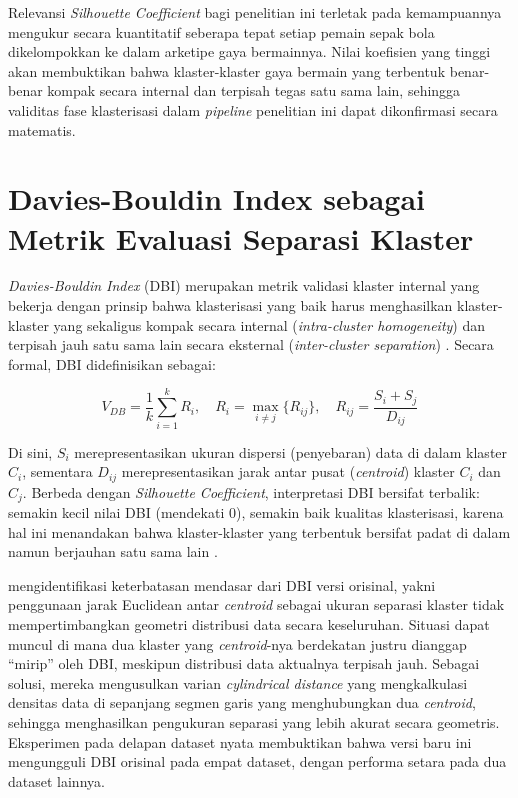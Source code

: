 Relevansi \emph{Silhouette Coefficient} bagi penelitian ini terletak pada kemampuannya mengukur secara kuantitatif seberapa tepat setiap pemain sepak bola dikelompokkan ke dalam arketipe gaya bermainnya. Nilai koefisien yang tinggi akan membuktikan bahwa klaster-klaster gaya bermain yang terbentuk benar-benar kompak secara internal dan terpisah tegas satu sama lain, sehingga validitas fase klasterisasi dalam \emph{pipeline} penelitian ini dapat dikonfirmasi secara matematis.

\section{Davies-Bouldin Index sebagai Metrik Evaluasi Separasi Klaster}
\label{sec:dbi}

\emph{Davies-Bouldin Index} (DBI) merupakan metrik validasi klaster internal yang bekerja dengan prinsip bahwa klasterisasi yang baik harus menghasilkan klaster-klaster yang sekaligus kompak secara internal (\emph{intra-cluster homogeneity}) dan terpisah jauh satu sama lain secara eksternal (\emph{inter-cluster separation}) \parencite{rojasthomas2013}. Secara formal, DBI didefinisikan sebagai:

\begin{equation}
  V_{DB} = \frac{1}{k} \sum_{i=1}^{k} R_i,
  \quad R_i = \max_{i \neq j} \{ R_{ij} \},
  \quad R_{ij} = \frac{S_i + S_j}{D_{ij}}
  \label{eq:dbi}
\end{equation}

\noindent Di sini, $S_i$ merepresentasikan ukuran dispersi (penyebaran) data di dalam klaster $C_i$, sementara $D_{ij}$ merepresentasikan jarak antar pusat (\emph{centroid}) klaster $C_i$ dan $C_j$. Berbeda dengan \emph{Silhouette Coefficient}, interpretasi DBI bersifat terbalik: semakin kecil nilai DBI (mendekati 0), semakin baik kualitas klasterisasi, karena hal ini menandakan bahwa klaster-klaster yang terbentuk bersifat padat di dalam namun berjauhan satu sama lain \parencite{rojasthomas2013}.

\textcite{rojasthomas2013} mengidentifikasi keterbatasan mendasar dari DBI versi orisinal, yakni penggunaan jarak Euclidean antar \emph{centroid} sebagai ukuran separasi klaster tidak mempertimbangkan geometri distribusi data secara keseluruhan. Situasi dapat muncul di mana dua klaster yang \emph{centroid}-nya berdekatan justru dianggap ``mirip'' oleh DBI, meskipun distribusi data aktualnya terpisah jauh. Sebagai solusi, mereka mengusulkan varian \emph{cylindrical distance} yang mengkalkulasi densitas data di sepanjang segmen garis yang menghubungkan dua \emph{centroid}, sehingga menghasilkan pengukuran separasi yang lebih akurat secara geometris. Eksperimen pada delapan dataset nyata membuktikan bahwa versi baru ini mengungguli DBI orisinal pada empat dataset, dengan performa setara pada dua dataset lainnya.

